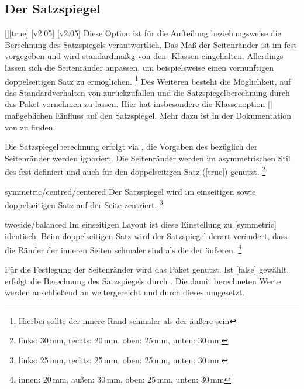 \subsection{Der Satzspiegel}
\begin{Declaration}[v2.03]{[\PSet]}[true]%
\printdeclarationlist%
%
%
%
%
%
[v2.05]
[v2.05]
Diese Option ist für die Aufteilung beziehungsweise die Berechnung des 
Satzspiegels verantwortlich. Das Maß der Seitenränder ist im \CD fest 
vorgegeben und wird standardmäßig von den \TUDScript-Klassen eingehalten. 
Allerdings lassen sich die Seitenränder anpassen, um beispielsweise einen 
vernünftigen doppelseitigen Satz zu ermöglichen.%
\footnote{Hierbei sollte der innere Rand schmaler als der äußere sein}
Des Weiteren besteht die Möglichkeit, auf das Standardverhalten von 
\KOMAScript{} zurückzufallen und die Satzspiegelberechnung durch das Paket
 vornehmen zu lassen. Hier hat insbesondere die Klassenoption 
[\PSet] maßgeblichen Einfluss auf den Satzspiegel. Mehr dazu ist in 
der Dokumentation von \KOMAScript{} zu finden.
%
\begin{values}
\itemfalse
  Die Satzspiegelberechnung erfolgt via , die Vorgaben des 
  \CDs bezüglich der Seitenränder werden ignoriert.
\itemtrue*[asymmetric/cd]
  Die Seitenränder werden im asymmetrischen Stil des \CDs fest definiert und 
  auch für den doppelseitigen Satz ([true]) genutzt.%
  \footnote{links: 30\,mm, rechts: 20\,mm, oben: 25\,mm, unten: 30\,mm}
\item[symmetric/centred/centered]
  Der Satzspiegel wird im einseitigen sowie doppelseitigen Satz auf der Seite 
  zentriert.%
  \footnote{links: 25\,mm, rechts: 25\,mm, oben: 25\,mm, unten: 30\,mm}
\item[twoside/balanced]
  Im einseitigen Layout ist diese Einstellung zu [symmetric] 
  identisch. Beim doppelseitigen Satz wird der Satzspiegel derart verändert, 
  dass die Ränder der inneren Seiten schmaler sind als die der äußeren.%
  \footnote{innen: 20\,mm, außen: 30\,mm, oben: 25\,mm, unten: 30\,mm}
\end{values}
%
Für die Festlegung der Seitenränder wird das Paket  genutzt. 
Ist [false] gewählt, erfolgt die Berechnung des Satzspiegels 
durch . Die damit berechneten Werte werden anschließend an 
 weitergereicht und durch dieses umgesetzt.
\end{Declaration}

